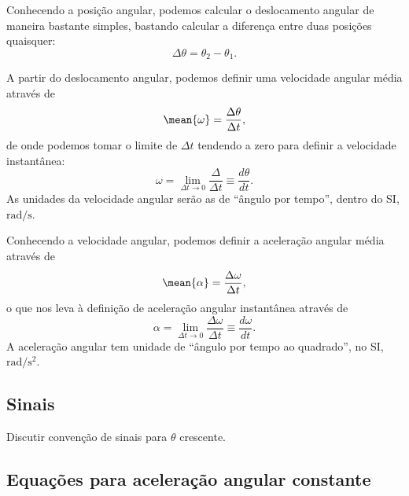 
Conhecendo a posição angular, podemos calcular o deslocamento angular de maneira bastante simples, bastando calcular a diferença entre duas posições quaisquer:
\begin{equation}
	\Delta\theta = \theta_2 - \theta_1.
\end{equation}

A partir do deslocamento angular, podemos definir uma velocidade angular média através de
\begin{equation}
	\mean{\omega} = \frac{\Delta\theta}{\Delta t},
\end{equation}
%
de onde podemos tomar o limite de $\Delta t$ tendendo a zero para definir a velocidade instantânea:
\begin{equation}
	\omega = \lim_{\Delta t \to 0} \frac{\Delta}{\Delta t} \equiv \frac{d\theta}{dt}.
\end{equation}
%
As unidades da velocidade angular serão as de ``ângulo por tempo'', dentro do SI, $\textrm{rad}/\textrm{s}$.

Conhecendo a velocidade angular, podemos definir a aceleração angular média através de
\begin{equation}
	\mean{\alpha} = \frac{\Delta \omega}{\Delta t},
\end{equation}
%
o que nos leva à definição de aceleração angular instantânea através de
\begin{equation}
	\alpha = \lim_{\Delta t \to 0} \frac{\Delta\omega}{\Delta t} \equiv \frac{d\omega}{dt}.
\end{equation}
%
A aceleração angular tem unidade de ``ângulo por tempo ao quadrado'', no SI, $\textrm{rad}/\textrm{s}^2$.

\subsection{Sinais}

Discutir convenção de sinais para $\theta$ crescente.

\subsection{Equações para aceleração angular constante}

